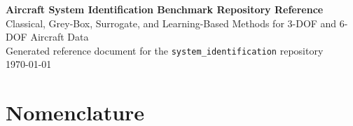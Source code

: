 \documentclass[11pt]{article}
\begin{document}
\begin{center}
{\LARGE\bfseries Aircraft System Identification Benchmark Repository Reference}\\[0.75em]
{\large Classical, Grey-Box, Surrogate, and Learning-Based Methods for 3-DOF and 6-DOF Aircraft Data}\\[0.75em]
{\normalsize Generated reference document for the \texttt{system\_identification} repository}\\[0.5em]
{\normalsize \today}
\end{center}
\vspace{1em}

\begin{abstract}
This document is the technical reference for the \texttt{system\_identification}
repository. It defines the benchmark motivation, aircraft models, generated
datasets, measurement assumptions, hidden-control cases, implemented
identification methods, code-to-equation traceability, validation metrics, and
current result summaries. The repository focuses on aircraft system
identification for small fixed-wing vehicles when motion capture may be the
only trusted measurement source. The current benchmark suite includes a
nonlinear 3-DOF longitudinal model with nominal-plus-unmodeled aerodynamic
terms, direct-state and motion-capture-derived observation modes, hidden
SAFE-like command reshaping, multiple maneuver families, and a developing
6-DOF model/data interface. The purpose of this reference is reproducibility:
it should be possible to trace each equation, dataset field, result table, and
figure back to repository code and regenerated artifacts.
\end{abstract}

\tableofcontents
\clearpage

\section*{Nomenclature}
\end{document}

